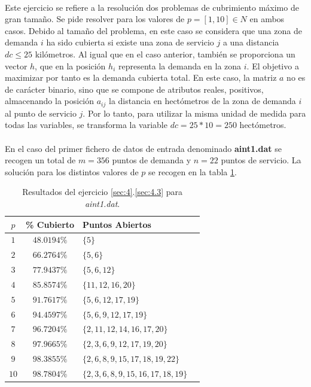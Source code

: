 \documentclass[spanish]{article}
\begin{document}
			\paragraph{}
			Este ejercicio se refiere a la resolución dos problemas de cubrimiento máximo de gran tamaño. Se pide resolver para los valores de $p = [1, 10] \in N$ en ambos casos. Debido al tamaño del problema, en este caso se considera que una zona de demanda $i$ ha sido cubierta si existe una zona de servicio $j$ a una distancia $dc \leq 25$ kilómetros. Al igual que en el caso anterior, también se proporciona un vector $h$, que en la posición $h_i$ representa la demanda en la zona $i$. El objetivo a maximizar por tanto es la demanda cubierta total. En este caso, la matriz $a$ no es de carácter binario, sino que se compone de atributos reales, positivos, almacenando la posición $a_{ij}$ la distancia en hectómetros de la zona de demanda $i$ al punto de servicio $j$. Por lo tanto, para utilizar la misma unidad de medida para todas las variables, se transforma la variable $dc = 25 * 10 = 250$ hectómetros.

			\paragraph{}
			En el caso del primer fichero de datos de entrada denominado \textbf{aint1.dat} se recogen un total de $m = 356$ puntos de demanda y $n=22$ puntos de servicio. La solución para los distintos valores de $p$ se recogen en la tabla \ref{table:sol-4.3a}.

			\begin{table}[h]
				\begin{center}
					\begin{tabular}{|c || c || l || c | }
						\hline
						$p$		&	\% Cubierto	& Puntos Abiertos 						 	\\ \hline \hline
						$1$ 	& $48.0194\%$ & $\{5\}$ 											\\ \hline
						$2$ 	& $66.2764\%$ & $\{5,6\}$ 										\\ \hline
						$3$ 	& $77.9437\%$ & $\{5,6,12\}$ 									\\ \hline
						$4$ 	& $85.8574\%$ & $\{11,12,16,20\}$ 						\\ \hline
						$5$ 	& $91.7617\%$ & $\{5,6,12,17,19\}$ 						\\ \hline
						$6$ 	& $94.4597\%$ & $\{5,6,9,12,17,19\}$ 					\\ \hline
						$7$ 	& $96.7204\%$ & $\{2,11,12,14,16,17,20\}$ 		\\ \hline
						$8$ 	& $97.9665\%$ & $\{2,3,6,9,12,17,19,20\}$ 		\\ \hline
						$9$ 	& $98.3855\%$ & $\{2,6,8,9,15,17,18,19,22\}$	\\ \hline
						$10$ 	& $98.7804\%$ & $\{2,3,6,8,9,15,16,17,18,19\}$\\
						\hline
					\end{tabular}
				\end{center}
				\caption{Resultados del ejercicio \ref{sec:4}.\ref{sec:4.3} para \emph{aint1.dat}.}
				\label{table:sol-4.3a}
			\end{table}
\end{document}
